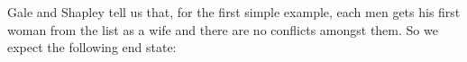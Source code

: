 {Gale and Shapley tell us that, for the first simple example, each men gets his first woman from the list as a wife and there are no conflicts amongst them. So we expect the following end state:
\begin{code}%
\>[0]\AgdaSpace{}%
\AgdaSymbol{=}\AgdaSpace{}%
%
\>[2787I]\<%
\\
\>[.][@{}l@{}]\<[2787I]%
\>[24]\AgdaInductiveConstructor{[]}\<%
\\
%
\>[24]\AgdaSymbol{((}\AgdaSpace{}%
\AgdaOperator{\AgdaInductiveConstructor{,}}\AgdaSpace{}%
\AgdaSymbol{(}\AgdaSpace{}%
\AgdaSpace{}%
\AgdaSpace{}%
\AgdaSpace{}%
\AgdaInductiveConstructor{[]}\AgdaSymbol{))}\AgdaSpace{}%
\<%
\\
\>[24][@{}l@{\AgdaIndent{0}}]%
\>[25]\AgdaSymbol{((}\AgdaSpace{}%
\AgdaOperator{\AgdaInductiveConstructor{,}}\AgdaSpace{}%
\AgdaSpace{}%
\AgdaSpace{}%
\AgdaSpace{}%
\AgdaSpace{}%
\AgdaInductiveConstructor{[]}\AgdaSymbol{)}\AgdaSpace{}%
\<%
\\
\>[25][@{}l@{\AgdaIndent{0}}]%
\>[26]\AgdaSymbol{(}\AgdaSpace{}%
\AgdaOperator{\AgdaInductiveConstructor{,}}\AgdaSpace{}%
\AgdaSpace{}%
\AgdaSpace{}%
\AgdaSpace{}%
\AgdaSpace{}%
\AgdaInductiveConstructor{[]}\AgdaSymbol{)}\AgdaSpace{}%
\AgdaSpace{}%
\AgdaInductiveConstructor{[]}\AgdaSpace{}%
\AgdaSymbol{))}\<%
\\
%
\>[24]\<%
\\
%
\>[24]\AgdaSymbol{((}\AgdaSpace{}%
\AgdaOperator{\AgdaInductiveConstructor{,}}\AgdaSpace{}%
\AgdaSymbol{)}\AgdaSpace{}%
\AgdaSpace{}%
\AgdaSymbol{(}\AgdaSpace{}%
\AgdaOperator{\AgdaInductiveConstructor{,}}\AgdaSpace{}%
\AgdaSymbol{)}\AgdaSpace{}%
\AgdaSpace{}%
\AgdaSymbol{(}\AgdaSpace{}%
\AgdaOperator{\AgdaInductiveConstructor{,}}\AgdaSpace{}%
\AgdaSymbol{)}\AgdaSpace{}%
\AgdaSpace{}%
\AgdaInductiveConstructor{[]}\AgdaSymbol{)}\<%
\\
%
\>[24]\<%
\\
%
\>[24]\<%
\\
\>[0]%
\>[14]\AgdaSymbol{=}\AgdaSpace{}%
\AgdaSpace{}%
\AgdaSymbol{(}\AgdaSpace{}%
\AgdaSymbol{(}\AgdaSpace{}%
\AgdaSymbol{(}\AgdaSpace{}%
\AgdaSymbol{)))}\<%
\end{code}

}
